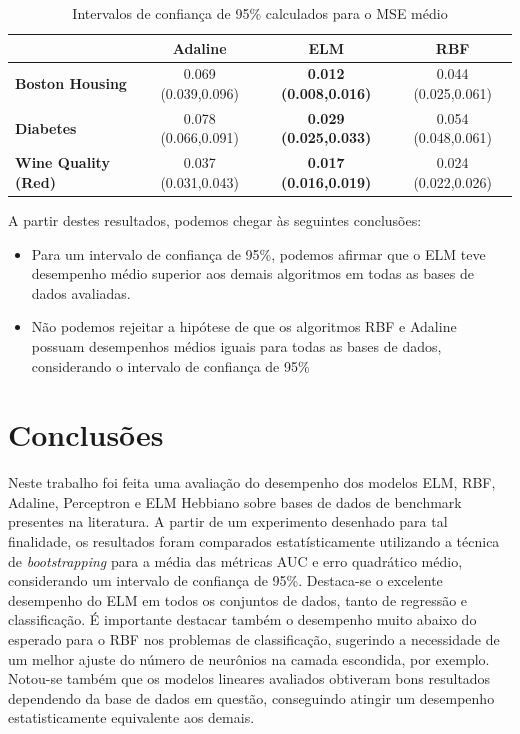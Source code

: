 \documentclass[conference]{IEEEtran}
\begin{document}
	
	\begin{table}[thpbh]
		\caption{Intervalos de confiança de 95\% calculados para o MSE médio}
		\label{tab:regression}
		\centering
			\begin{tabular}{l|c|c|c|}
				\cline{2-4}
				& \textbf{Adaline} & \textbf{ELM}              & \textbf{RBF}     \\ \hline
				\multicolumn{1}{|l|}{\textbf{Boston Housing}} & 0.069 (0.039,0.096) & \textbf{0.012 (0.008,0.016)} & 0.044 (0.025,0.061) \\ \hline
				\multicolumn{1}{|l|}{\textbf{Diabetes}}       & 0.078 (0.066,0.091) & \textbf{0.029 (0.025,0.033)} & 0.054 (0.048,0.061) \\ \hline
				\multicolumn{1}{|l|}{\textbf{Wine Quality (Red)}}     & 0.037 (0.031,0.043) & \textbf{0.017 (0.016,0.019)} & 0.024 (0.022,0.026) \\ \hline
			\end{tabular}
	\end{table}

	A partir destes resultados, podemos chegar às seguintes conclusões:
	\begin{itemize}
		\item Para um intervalo de confiança de 95\%, podemos afirmar que o ELM teve desempenho médio superior aos demais algoritmos em todas as bases de dados avaliadas.
		\item Não podemos rejeitar a hipótese de que os algoritmos RBF e Adaline possuam desempenhos médios iguais para todas as bases de dados, considerando o intervalo de confiança de 95\%
	\end{itemize}
	
	
	
	\section{Conclusões}
	
	Neste trabalho foi feita uma avaliação do desempenho dos modelos ELM, RBF, Adaline, Perceptron e ELM Hebbiano sobre bases de dados de benchmark presentes na literatura. A partir de um experimento desenhado para tal finalidade, os resultados foram comparados estatísticamente utilizando a técnica de \textit{bootstrapping} para a média das métricas AUC e erro quadrático médio, considerando um intervalo de confiança de 95\%. Destaca-se o excelente desempenho do ELM em todos os conjuntos de dados, tanto de regressão e classificação. É importante destacar também o desempenho muito abaixo do esperado para o RBF nos problemas de classificação, sugerindo a necessidade de um melhor ajuste do número de neurônios na camada escondida, por exemplo. Notou-se também que os modelos lineares avaliados obtiveram bons resultados dependendo da base de dados em questão, conseguindo atingir um desempenho estatisticamente equivalente aos demais.
	
\end{document}
